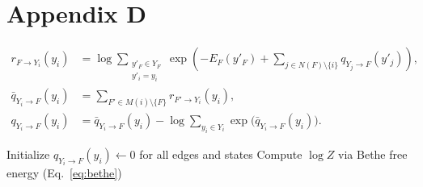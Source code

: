 \newpage
\pagecolor{lightmauve}
\chapter{Appendix D}
\label{appendix_d}

\begin{align}
r_{F \to Y_i}(y_i) &= \log \sum_{\substack{y'_F \in Y_F \\ y'_i = y_i}}
   \exp\!\left(-E_F(y'_F) + \sum_{j \in N(F)\setminus\{i\}} q_{Y_j \to F}(y'_j)\right), \label{eq:lbf_fac2var}\\
\bar q_{Y_i \to F}(y_i) &= \sum_{F' \in M(i)\setminus\{F\}} r_{F' \to Y_i}(y_i), \label{eq:lbf_var2fac_raw}\\
q_{Y_i \to F}(y_i) &= \bar q_{Y_i \to F}(y_i) -
   \log \sum_{y_i \in Y_i}\exp\!\big(\bar q_{Y_i \to F}(y_i)\big). \label{eq:lbf_var2fac}
\end{align}

\begin{algorithm}[H]
\caption{Loopy Belief Propagation (Sum–Product)}
\BlankLine
Initialize $q_{Y_i\to F}(y_i)\gets 0$ for all edges and states\;
Compute $\log Z$ via Bethe free energy (Eq.~\eqref{eq:bethe})\;
\end{algorithm}
